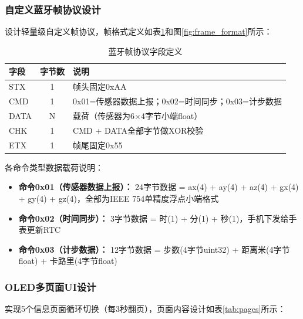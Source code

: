 \FloatBarrier

\subsubsection{自定义蓝牙帧协议设计}
设计轻量级自定义帧协议，帧格式定义如表\ref{tab:frame}和图\ref{fig:frame_format}所示：

\begin{table}[h]
    \centering
    \caption{蓝牙帧协议字段定义}
    \label{tab:frame}
    \begin{tabular}{|l|c|l|}
        \hline
        \textbf{字段} & \textbf{字节数} & \textbf{说明} \\ \hline
        STX & 1 & 帧头固定0xAA \\ \hline
        CMD & 1 & 0x01=传感器数据上报；0x02=时间同步；0x03=计步数据 \\ \hline
        DATA & N & 载荷（传感器为6$\times$4字节小端float） \\ \hline
        CHK & 1 & CMD + DATA全部字节做XOR校验 \\ \hline
        ETX & 1 & 帧尾固定0x55 \\ \hline
    \end{tabular}
\end{table}

\begin{center}
    \label{fig:frame_format}
\end{center}

各命令类型数据载荷说明：
\begin{itemize}
    \item \textbf{命令0x01（传感器数据上报）：} 24字节数据 = ax(4) + ay(4) + az(4) + gx(4) + gy(4) + gz(4)，全部为IEEE 754单精度浮点小端格式
    \item \textbf{命令0x02（时间同步）：} 3字节数据 = 时(1) + 分(1) + 秒(1)，手机下发给手表更新RTC
    \item \textbf{命令0x03（计步数据）：} 12字节数据 = 步数(4字节uint32) + 距离米(4字节float) + 卡路里(4字节float)
\end{itemize}

\subsubsection{OLED多页面UI设计}
实现5个信息页面循环切换（每3秒翻页），页面内容设计如表\ref{tab:pages}所示：

